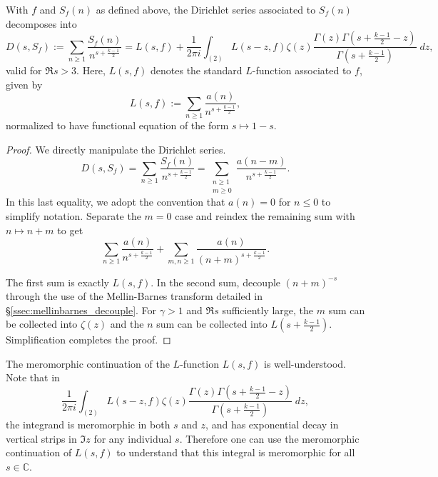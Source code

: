 \begin{proposition}
  With $f$ and $S_f(n)$ as defined above, the Dirichlet series associated to $S_f(n)$
  decomposes into
  \begin{equation}\label{eq:DsSf_decomposition}
    D(s, S_f) := \sum_{n \geq 1} \frac{S_f(n)}{n^{s + \frac{k-1}{2}}} = L(s, f) +
    \frac{1}{2\pi i} \int_{(2)} L(s-z, f) \zeta(z) \frac{\Gamma(z) \Gamma(s +
    \frac{k-1}{2} - z)}{\Gamma(s + \frac{k-1}{2})} \; dz,
  \end{equation}
  valid for $\Re s > 3$.
  Here, $L(s, f)$ denotes the standard $L$-function associated to $f$, given by
  \begin{equation}
    L(s, f) := \sum_{n \geq 1} \frac{a(n)}{n^{s + \frac{k-1}{2}}},
  \end{equation}
  normalized to have functional equation of the form $s \mapsto 1-s$.
\end{proposition}


\begin{proof}
  We directly manipulate the Dirichlet series.
  \begin{equation}
    D(s, S_f) = \sum_{n \geq 1} \frac{S_f(n)}{n^{s + \frac{k-1}{2}}} = \sum_{\substack{n
    \geq 1 \\ m \geq 0}} \frac{a(n-m)}{n^{s + \frac{k-1}{2}}}.
  \end{equation}
  In this last equality, we adopt the convention that $a(n) = 0$ for $n \leq 0$ to
  simplify notation.
  Separate the $m = 0$ case and reindex the remaining sum with $n \mapsto n+m$ to get
  \begin{equation}
    \sum_{n \geq 1} \frac{a(n)}{n^{s + \frac{k-1}{2}}} + \sum_{m,n \geq 1}
    \frac{a(n)}{(n+m)^{s + \frac{k-1}{2}}}.
  \end{equation}


  The first sum is exactly $L(s, f)$.
  In the second sum, decouple $(n+m)^{-s}$ through the use of the Mellin-Barnes transform
  detailed in \S\ref{ssec:mellinbarnes_decouple}.
  For $ \gamma > 1$ and $\Re s$ sufficiently large, the $m$ sum can be collected into
  $\zeta(z)$ and the $n$ sum can be collected into $L(s + \frac{k-1}{2})$.
  Simplification completes the proof.
\end{proof}


The meromorphic continuation of the $L$-function $L(s,f)$ is well-understood.
Note that in
\begin{equation}
  \frac{1}{2\pi i} \int_{(2)} L(s - z, f) \zeta(z) \frac{\Gamma(z) \Gamma(s +
  \frac{k-1}{2} - z)}{\Gamma(s + \frac{k-1}{2})} \; dz,
\end{equation}
the integrand is meromorphic in both $s$ and $z$, and has exponential decay in vertical
strips in $\Im z$ for any individual $s$.
Therefore one can use the meromorphic continuation of $L(s,f)$ to understand that this
integral is meromorphic for all $s \in \mathbb{C}$.


